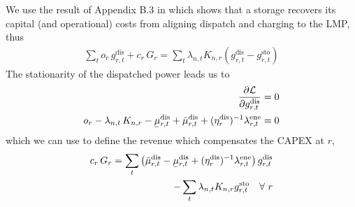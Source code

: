 \documentclass[11pt,twocolumn]{article}
\newcommand{\ubar}[1]{\underaccent{\bar}{#1}}
\newcommand{\Forall}[1]{\hspace{10pt} \forall \,\, #1 }
\newcommand{\pdv}[2]{\frac{\partial #1}{\partial #2}}
\newcommand{\storage}{g_{r,t}}
\newcommand{\storagedispatch}{\storage^\text{dis}}
\newcommand{\storagecharge}{\storage^\text{sto}}
\newcommand{\storagesoc}{\storage^\text{ene}}
\newcommand{\efficiency}{\eta_{r}}
\newcommand{\efficiencydispatch}{\efficiency^\text{dis}}
\newcommand{\efficiencycharge}{\efficiency^\text{sto}}
\newcommand{\efficiencysoc}{\efficiency^\text{ene}}
\newcommand{\operationalpricestorage}{o_r}
\newcommand{\capitalpricestorage}{c_r}
\newcommand{\capacitystorage}{G_r}
\newcommand{\mulowerstoragedispatch}{\ubar{\mu}_{r,t}^\text{dis}}
\newcommand{\muupperstoragedispatch}{\bar{\mu}_{r,t}^\text{dis}}
\newcommand{\mulowerstoragecharge}{\ubar{\mu}_{r,t}^\text{sto}}
\newcommand{\muupperstoragecharge}{\bar{\mu}_{r,t}^\text{sto}}
\newcommand{\mulowerstoragesoc}{\ubar{\mu}_{r,t}^\text{ene}}
\newcommand{\muupperstoragesoc}{\bar{\mu}_{r,t}^\text{ene}}
\newcommand{\mustateofcharge}{\lambda^\text{ene}_{r,t}}
\newcommand{\munextstateofcharge}{\lambda^\text{ene}_{r,t+1}}
\newcommand{\lagrangian}{\mathcal{L}}
\newcommand{\lmp}[1][n]{\lambda_{#1,t}}
\newcommand{\incidencestorage}[1][n]{K_{#1,r}}
\begin{document}
We use the result of Appendix B.3 in \cite{brown_decreasing_2020} which shows that a storage recovers its capital (and operational) costs from aligning dispatch and charging to the LMP, thus 
\begin{align}
    \sum_t \operationalpricestorage \, \storagedispatch + \capitalpricestorage \, \capacitystorage = \sum_t \lmp \incidencestorage \left(\storagedispatch - \storagecharge \right) 
\end{align}
The stationarity of the dispatched power leads us to  
\begin{align}
    \notag
    \pdv{\lagrangian}{\storagedispatch} &= 0 \\
    \operationalpricestorage -  \lmp \, \incidencestorage - \mulowerstoragedispatch + \muupperstoragedispatch + (\efficiencydispatch )^{-1} \mustateofcharge &= 0  
    \label{eq:stationarity_storagedispatch}
\end{align}
which we  can use to define the revenue which compensates the CAPEX at $r$, 
\begin{align}
    \notag
    \capitalpricestorage \, \capacitystorage = \sum_t \left(\muupperstoragedispatch - \mulowerstoragedispatch  + (\efficiencydispatch )^{-1} \mustateofcharge \right) \storagedispatch \\
    - \sum_t \lmp \incidencestorage  \storagecharge \Forall{r} 
\end{align}

\end{document}
